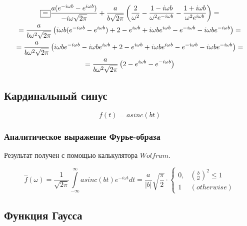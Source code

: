\documentclass[a5paper, 10pt]{article}
\theoremstyle{definition}
\theoremstyle{plain}
\theoremstyle{remark}
\begin{document}
\begin{multline}
\fbox{=} \frac{a ( e^{-i \omega b} -  e^{i \omega b})}{-i\omega \sqrt{2 \pi}} + \frac{a}{b\sqrt{2 \pi}} \left( \frac{2}{\omega^2} -
 \frac{1 - i \omega b}{\omega^2 e^{-i \omega b}} - \frac{1 + i \omega b}{\omega^2 e^{i \omega b}}  \right) =\\
=\frac{a}{b \omega^2 \sqrt{2 \pi}} \left( i\omega b (e^{-i \omega b} - e^{i \omega b}) + 2 - e^{i\omega b} + i \omega b e^{i\omega b} - e^{-i\omega b} - i \omega b e^{-i\omega b} \right) = \\
= \frac{a}{b \omega^2 \sqrt{2 \pi}} \left( i\omega b e^{-i \omega b} - i\omega b e^{i \omega b} + 2 - e^{i\omega b} + i \omega b e^{i\omega b} - e^{-i\omega b} - i \omega b e^{-i\omega b} \right) = \\
= \frac{a}{b \omega^2 \sqrt{2 \pi}} \left( 2 - e^{i\omega b}  - e^{-i\omega b} \right) 
\end{multline}




\newpage
\subsection{Кардинальный синус}
\begin{equation}
f(t) = a sinc(bt)
\end{equation}


\subsubsection{Аналитическое выражение Фурье-образа}

Результат получен с помощью калькулятора $Wolfram$.

\begin{equation}
\hat{f}(\omega) =
 \frac{1}{\sqrt{2 \pi}} \int \limits_{-\infty}^{\infty}  a sinc(bt) e^{-i \omega t} dt = 
 \frac{a}{|b|} \sqrt{\frac{\pi}{2}} \cdot
\begin{cases}
0, & \left( \frac{b}{\omega} \right)^2 \leq 1\\
1 & (otherwise)
\end{cases}
\end{equation}







\newpage
\subsection{Функция Гаусса}
\end{document}
